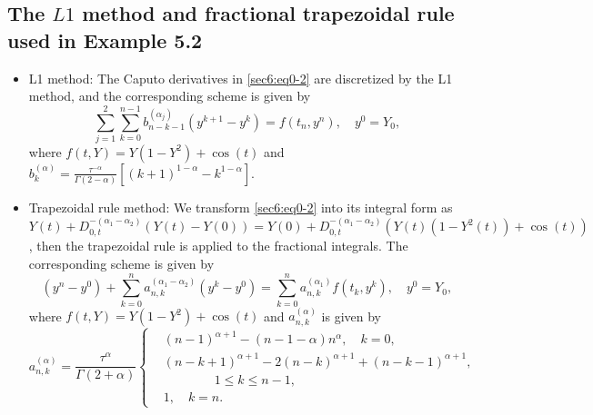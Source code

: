 \documentclass[10pt]{siamltex}
\begin{document}
\subsection{The $L1$ method and fractional trapezoidal rule used in Example 5.2}
\begin{itemize}
  \item L1 method:  The Caputo derivatives in \eqref{sec6:eq0-2}  are discretized by the L1 method, and the corresponding scheme is given by
\begin{equation}\label{L1}
\sum_{j=1}^2\sum_{k=0}^{n-1}b^{(\alpha_j)}_{n-k-1}(y^{k+1}-y^k)
= f(t_n,y^n),{\quad}y^0=Y_0,
\end{equation}
where  $f(t,Y)=Y(1-Y^2)+\cos(t)$ and
$b^{(\alpha)}_k=\frac{\tau^{-\alpha}}{\Gamma(2-\alpha)}[(k+1)^{1-\alpha}-k^{1-\alpha}]$.

  \item Trapezoidal rule method: We   transform \eqref{sec6:eq0-2} into its integral form as $Y(t)+D^{-(\alpha_1-\alpha_2)}_{0,t}(Y(t)-Y(0))= Y(0)+D^{-(\alpha_1-\alpha_2)}_{0,t}(Y(t)(1-Y^2(t))+\cos(t))$, then the trapezoidal rule is applied to the fractional integrals. The corresponding   scheme is given by
\begin{equation}\label{trapezoidal}
(y^n -y^0)+ \sum_{k=0}^{n}a^{(\alpha_1-\alpha_2)}_{n,k}(y^k-y^0)
= \sum_{k=0}^{n}a^{(\alpha_1)}_{n,k}f(t_k,y^k),{\quad}y^0=Y_0,
\end{equation}
where   $f(t,Y)=Y(1-Y^2)+\cos(t)$ and $a^{(\alpha)}_{n,k}$ is given by
\begin{equation*}
a^{(\alpha)}_{n,k}=\frac{\tau^{\alpha}}{\Gamma(2+\alpha)}\left\{\begin{aligned}
&(n-1)^{\alpha+1}-(n-1-\alpha)n^{\alpha},{\quad}k=0,\\
&(n-k+1)^{\alpha+1}-2(n-k)^{\alpha+1}+(n-k-1)^{\alpha+1},\\
&{\qquad\qquad}1\leq k \leq n-1,\\
&1,{\quad}k=n.
\end{aligned}\right.
\end{equation*}
\end{itemize}
\end{document}
